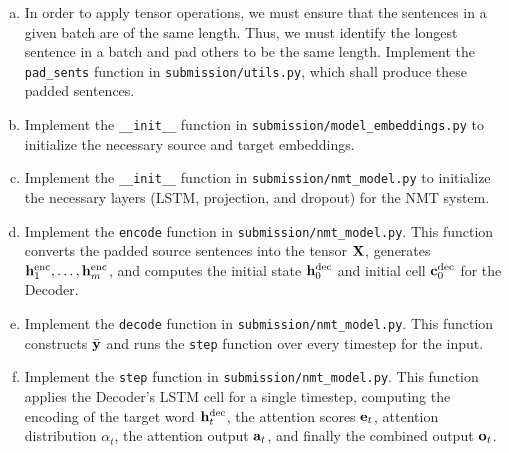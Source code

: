 \begin{enumerate}[(a)]
    \item {} In order to apply tensor operations, we must ensure that the sentences in a given batch are of the same length. Thus, we must identify the longest sentence in a batch and pad others to be the same length. Implement the \texttt{pad\_sents} function in \texttt{submission/utils.py}, which shall produce these padded sentences.

    \item {} Implement the \texttt{\_\_init\_\_} function in \texttt{submission/model\_embeddings.py} to initialize the necessary source and target embeddings.

    \item {} Implement the \texttt{\_\_init\_\_} function in \texttt{submission/nmt\_model.py} to initialize the necessary layers (LSTM, projection, and dropout) for the NMT system.

    \item {} Implement the \texttt{encode} function in \texttt{submission/nmt\_model.py}. This function converts the padded source sentences into the tensor $\mathbf{X}$, generates $\mathbf{h}^{\text{enc}}_1, \dots, \mathbf{h}^{\text{enc}}_m$, and computes the initial state $\mathbf{h}^{\text{dec}}_0$ and initial cell $\mathbf{c}^{\text{dec}}_0$ for the Decoder.

    \item {} Implement the \texttt{decode} function in \texttt{submission/nmt\_model.py}. This function constructs $\bar{\mathbf{y}}$ and runs the \texttt{step} function over every timestep for the input.

    \item {} Implement the \texttt{step} function in \texttt{submission/nmt\_model.py}. This function applies the Decoder's LSTM cell for a single timestep, computing the encoding of the target word $\mathbf{h}^{\text{dec}}_t$, the attention scores $\mathbf{e}_t$, attention distribution $\alpha_t$, the attention output $\mathbf{a}_{t}$, and finally the combined output $\mathbf{o}_t$.


\end{enumerate}
